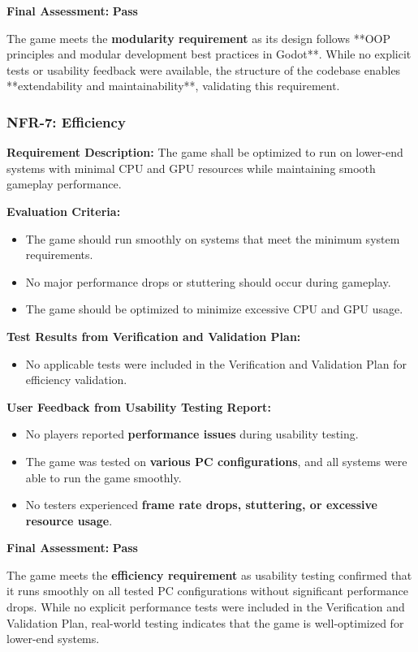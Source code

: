 \documentclass[12pt, titlepage]{article}
\begin{document}
\textbf{Final Assessment:} \textbf{Pass}  

The game meets the \textbf{modularity requirement} as its design follows **OOP principles and modular development best practices in Godot**. While no explicit tests or usability feedback were available, the structure of the codebase enables **extendability and maintainability**, validating this requirement.


\subsubsection{NFR-7: Efficiency}

\textbf{Requirement Description:}  
The game shall be optimized to run on lower-end systems with minimal CPU and GPU resources while maintaining smooth gameplay performance.

\textbf{Evaluation Criteria:}  
\begin{itemize}
    \item The game should run smoothly on systems that meet the minimum system requirements.
    \item No major performance drops or stuttering should occur during gameplay.
    \item The game should be optimized to minimize excessive CPU and GPU usage.
\end{itemize}

\textbf{Test Results from Verification and Validation Plan:}  
\begin{itemize}
    \item No applicable tests were included in the Verification and Validation Plan for efficiency validation.
\end{itemize}

\textbf{User Feedback from Usability Testing Report:}  
\begin{itemize}
    \item No players reported \textbf{performance issues} during usability testing.
    \item The game was tested on \textbf{various PC configurations}, and all systems were able to run the game smoothly.
    \item No testers experienced \textbf{frame rate drops, stuttering, or excessive resource usage}.
\end{itemize}

\textbf{Final Assessment:} \textbf{Pass} 
 
The game meets the \textbf{efficiency requirement} as usability testing confirmed that it runs smoothly on all tested PC configurations without significant performance drops. While no explicit performance tests were included in the Verification and Validation Plan, real-world testing indicates that the game is well-optimized for lower-end systems.
\end{document}
